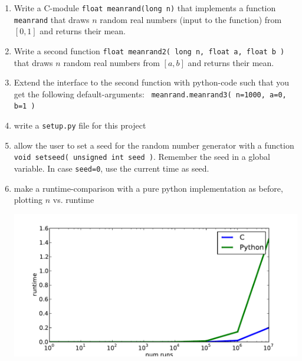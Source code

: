 \documentclass[12pt]{scrartcl}
\begin{document}
\begin{enumerate}
\item Write a C-module {\tt float meanrand(long n)} that implements a function {\tt
  meanrand} that draws $n$ random real numbers (input to the function)
  from $[0,1]$ and returns their mean.
\item Write a second function {\tt float meanrand2( long n, float a, float b
  )} that draws $n$ random real numbers from $[a,b]$ and returns their
  mean.
\item Extend the interface to the second function with python-code
  such that you get the following default-arguments: {\tt
    meanrand.meanrand3( n=1000, a=0, b=1 )}
\item write a {\tt setup.py} file for this project
\item allow the user to set a seed for the random number generator
  with a function {\tt void setseed( unsigned int seed )}. Remember the
  seed in a global variable. In case {\tt seed=0}, use the current
  time as seed.
\item make a runtime-comparison with a pure python implementation as
  before, plotting $n$ vs. runtime

\includegraphics[width=.6\textwidth]{pics/meanrand}
\end{enumerate}
\end{document}
